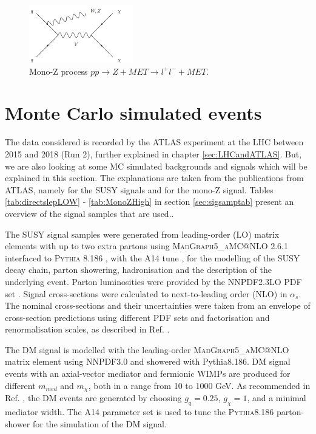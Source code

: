 \begin{figure}[H]
    \centering
    \includegraphics[width = 0.4\textwidth]{Figures/FeynmanDiagrams/monoZFeynman2.png}
    \caption{Mono-Z process $pp \rightarrow Z + MET \rightarrow l^+ l^- + MET$.}
    \label{fig:monoZFeynman2}
\end{figure}


\section{Monte Carlo simulated events}

The data considered is recorded by the ATLAS experiment at the LHC between 2015 and 2018 (Run 2), further explained in chapter \ref{sec:LHCandATLAS}. But, we are also looking at some MC simulated backgrounds and signals which will be explained in this section. The explanations are taken from the publications from ATLAS, namely \cite{sleptonexclusion} for the SUSY signals and \cite{monoZexclusion} for the mono-Z signal. Tables \ref{tab:directslepLOW} - \ref{tab:MonoZHigh} in section \ref{sec:sigsamptab} present an overview of the signal samples that are used.. 

The SUSY signal samples were generated from leading-order (LO) matrix elements with up to two extra partons using \textsc{MadGraph5\_aMC@NLO 2.6.1} \cite{48} interfaced to \textsc{Pythia 8.186} \cite{49}, with the A14 tune \cite{50}, for the modelling of the SUSY decay chain, parton showering, hadronisation and the description of the underlying event. Parton luminosities were provided by the NNPDF2.3LO PDF set \cite{51}. Signal cross-sections were calculated to next-to-leading order (NLO) in $\alpha_s$. The nominal cross-sections and their uncertainties were taken from an envelope of cross-section predictions using different PDF sets and factorisation and renormalisation scales, as described in Ref. \cite{60}. 


The DM signal is modelled with the leading-order \textsc{MadGraph5\_aMC@NLO} matrix element \cite{54Z} using NNPDF3.0 \cite{55Z} and showered with Pythia8.186. DM signal events with an axial-vector mediator and fermionic WIMPs are produced for different $m_{med}$ and $m_\chi$, both in a range from 10 to 1000 GeV.  As recommended in Ref. \cite{44Z}, the DM events are generated by choosing $g_q = 0.25$, $g_\chi = 1$, and a minimal mediator width. The A14 \cite{57Z} parameter set is used to tune the \textsc{Pythia8.186} parton-shower for the simulation of the DM signal.


